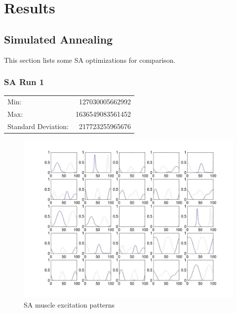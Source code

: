 \section{Results}

\subsection{Simulated Annealing}
This section lists some SA optimizations for comparison.

\subsubsection{SA Run 1} 
\label{sec:run_1}

\begin{tabular}{lr}
	Min: 			& 127030005662992 \\
	Max:			& 1636549083561452 \\
	Standard Deviation:	& 217723255965676\\
\end{tabular}

\begin{figure}[!h]
	\begin{center}
		\includegraphics[width=120mm]{images/saXX_exc}
               	\caption{SA muscle excitation patterns}
                \label{saXX_exc}
        \end{center}
\end{figure}

